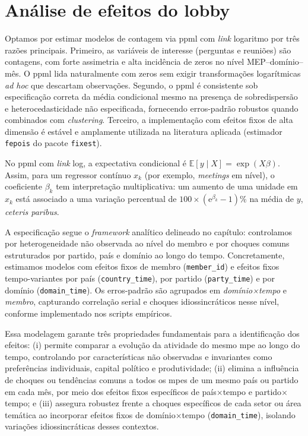 \section{Análise de efeitos do lobby}
\label{sec:resultados_efeitos}

Optamos por estimar modelos de contagem via \acrshort{ppml} com \textit{link} logaritmo por três razões principais. Primeiro, as variáveis de interesse (perguntas e reuniões) são contagens, com forte assimetria e alta incidência de zeros no nível MEP–domínio–mês. O \acrshort{ppml} lida naturalmente com zeros sem exigir transformações logarítmicas \textit{ad hoc} que descartam observações. Segundo, o \acrshort{ppml} é consistente sob especificação correta da média condicional mesmo na presença de sobredispersão e heterocedasticidade não especificada, fornecendo erros-padrão robustos quando combinados com \textit{clustering}. Terceiro, a implementação com efeitos fixos de alta dimensão é estável e amplamente utilizada na literatura aplicada (estimador \texttt{fepois} do pacote \texttt{fixest}).

No \acrshort{ppml} com \textit{link} log, a expectativa condicional é \(\mathbb{E}[y\mid X] = \exp(X\beta)\). Assim, para um regressor contínuo \(x_k\) (por exemplo, \textit{meetings} em nível), o coeficiente \(\beta_k\) tem interpretação multiplicativa: um aumento de uma unidade em \(x_k\) está associado a uma variação percentual de \(100\times(\mathrm{e}^{\beta_k}-1)\%\) na média de \(y\), \textit{ceteris paribus}.

A especificação segue o \textit{framework} analítico delineado no capítulo: controlamos por heterogeneidade não observada ao nível do membro e por choques comuns estruturados por partido, país e domínio ao longo do tempo. Concretamente, estimamos modelos com efeitos fixos de membro (\texttt{member\_id}) e efeitos fixos tempo-variantes por país (\texttt{country\_time}), por partido (\texttt{party\_time}) e por domínio (\texttt{domain\_time}). Os erros-padrão são agrupados em \textit{domínio×tempo} e \textit{membro}, capturando correlação serial e choques idiossincráticos nesse nível, conforme implementado nos scripts empíricos.

Essa modelagem garante três propriedades fundamentais para a identificação dos efeitos: (i) permite comparar a evolução da atividade do mesmo \acrshort{mpe} ao longo do tempo, controlando por características não observadas e invariantes como preferências individuais, capital político e produtividade; (ii) elimina a influência de choques ou tendências comuns a todos os \acrshort{mpe}s de um mesmo país ou partido em cada mês, por meio dos efeitos fixos específicos de país$\times$tempo e partido$\times$tempo; e (iii) assegura robustez frente a choques específicos de cada setor ou área temática ao incorporar efeitos fixos de domínio$\times$tempo (\texttt{domain\_time}), isolando variações idiossincráticas desses contextos.

